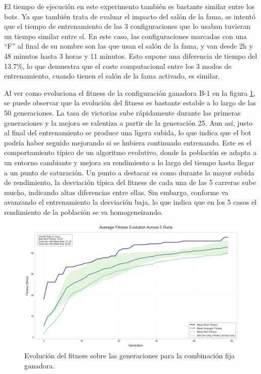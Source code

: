 El tiempo de ejecución en este experimento también es bastante similar entre los bots. Ya que también trata de evaluar el impacto del salón de la fama, se intentó que el tiempo de entrenamiento de las 3 configuraciones que lo usaban tuvieran un tiempo similar entre sí. En este caso, las configuraciones marcadas con una ``F'' al final de su nombre son las que usan el salón de la fama, y van desde 2h y 48 minutos hasta 3 horas y 11 minutos. Esto supone una diferencia de tiempo del 13.7\%, lo que demuestra que el coste computacional entre los 3 modos de entrenamiento, cuando tienen el salón de la fama activado, es similar.

Al ver como evoluciona el fitness de la configuración ganadora B-1 en la figura \ref{fig:fixed_fitness_evolution}, se puede observar que la evolución del fitness es bastante estable a lo largo de las 50 generaciones. La tasa de victorias sube rápidamente durante las primeras generaciones y la mejora se ralentiza a partir de la generación 25. Aun así, justo al final del entrenamiento se produce una ligera subida, lo que indica que el bot podría haber seguido mejorando si se hubiera continuado entrenando. Este es el comportamiento típico de un algoritmo evolutivo, donde la población se adapta a un entorno cambiante y mejora su rendimiento a lo largo del tiempo hasta llegar a un punto de saturación. Un punto a destacar es como durante la mayor subida de rendimiento, la desviación típica del fitness de cada una de las 5 carreras sube mucho, indicando altas diferencias entre ellas. Sin embargo, conforme va avanzando el entrenamiento la desviación baja, lo que indica que en los 5 casos el rendimiento de la población se va homogeneizando.

\begin{figure}[H]
	\centering
	\includegraphics[width=1.0\textwidth]{img/fixed_fitness_evolution.png}
	\caption{Evolución del fitness sobre las generaciones para la combinación fija ganadora.}
	\label{fig:fixed_fitness_evolution}
\end{figure}

